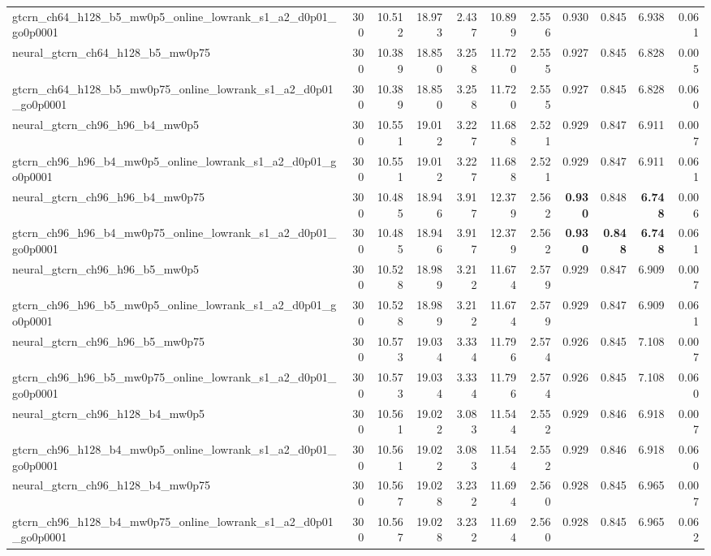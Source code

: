 \begin{table}[t]
\begin{tabular}{lrrrrrrrrrr}
gtcrn_ch64_h128_b5_mw0p5_online_lowrank_s1_a2_d0p01_go0p0001 & 300 & 10.512 & 18.973 & 2.437 & 10.899 & 2.556 & 0.930 & 0.845 & 6.938 & 0.061 \\
neural_gtcrn_ch64_h128_b5_mw0p75 & 300 & 10.389 & 18.850 & 3.258 & 11.720 & 2.555 & 0.927 & 0.845 & 6.828 & 0.005 \\
gtcrn_ch64_h128_b5_mw0p75_online_lowrank_s1_a2_d0p01_go0p0001 & 300 & 10.389 & 18.850 & 3.258 & 11.720 & 2.555 & 0.927 & 0.845 & 6.828 & 0.060 \\
neural_gtcrn_ch96_h96_b4_mw0p5 & 300 & 10.551 & 19.012 & 3.227 & 11.688 & 2.521 & 0.929 & 0.847 & 6.911 & 0.007 \\
gtcrn_ch96_h96_b4_mw0p5_online_lowrank_s1_a2_d0p01_go0p0001 & 300 & 10.551 & 19.012 & 3.227 & 11.688 & 2.521 & 0.929 & 0.847 & 6.911 & 0.061 \\
neural_gtcrn_ch96_h96_b4_mw0p75 & 300 & 10.485 & 18.946 & 3.917 & 12.379 & 2.562 & \textbf{0.930} & 0.848 & \textbf{6.748} & 0.006 \\
gtcrn_ch96_h96_b4_mw0p75_online_lowrank_s1_a2_d0p01_go0p0001 & 300 & 10.485 & 18.946 & 3.917 & 12.379 & 2.562 & \textbf{0.930} & \textbf{0.848} & \textbf{6.748} & 0.061 \\
neural_gtcrn_ch96_h96_b5_mw0p5 & 300 & 10.528 & 18.989 & 3.212 & 11.674 & 2.579 & 0.929 & 0.847 & 6.909 & 0.007 \\
gtcrn_ch96_h96_b5_mw0p5_online_lowrank_s1_a2_d0p01_go0p0001 & 300 & 10.528 & 18.989 & 3.212 & 11.674 & 2.579 & 0.929 & 0.847 & 6.909 & 0.061 \\
neural_gtcrn_ch96_h96_b5_mw0p75 & 300 & 10.573 & 19.034 & 3.334 & 11.796 & 2.574 & 0.926 & 0.845 & 7.108 & 0.007 \\
gtcrn_ch96_h96_b5_mw0p75_online_lowrank_s1_a2_d0p01_go0p0001 & 300 & 10.573 & 19.034 & 3.334 & 11.796 & 2.574 & 0.926 & 0.845 & 7.108 & 0.060 \\
neural_gtcrn_ch96_h128_b4_mw0p5 & 300 & 10.561 & 19.022 & 3.083 & 11.544 & 2.552 & 0.929 & 0.846 & 6.918 & 0.007 \\
gtcrn_ch96_h128_b4_mw0p5_online_lowrank_s1_a2_d0p01_go0p0001 & 300 & 10.561 & 19.022 & 3.083 & 11.544 & 2.552 & 0.929 & 0.846 & 6.918 & 0.060 \\
neural_gtcrn_ch96_h128_b4_mw0p75 & 300 & 10.567 & 19.028 & 3.232 & 11.694 & 2.560 & 0.928 & 0.845 & 6.965 & 0.007 \\
gtcrn_ch96_h128_b4_mw0p75_online_lowrank_s1_a2_d0p01_go0p0001 & 300 & 10.567 & 19.028 & 3.232 & 11.694 & 2.560 & 0.928 & 0.845 & 6.965 & 0.062 \\

\end{tabular}
\end{table}

